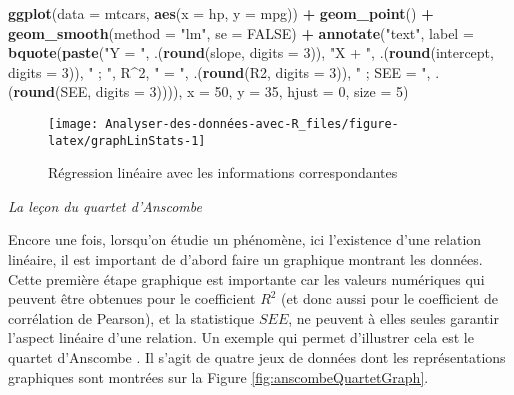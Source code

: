 \documentclass[
  french,
]{book}
\newenvironment{Shaded}{\begin{snugshade}}{\end{snugshade}}
\newcommand{\DataTypeTok}[1]{\textcolor[rgb]{0.13,0.29,0.53}{#1}}
\newcommand{\DecValTok}[1]{\textcolor[rgb]{0.00,0.00,0.81}{#1}}
\newcommand{\KeywordTok}[1]{\textcolor[rgb]{0.13,0.29,0.53}{\textbf{#1}}}
\newcommand{\NormalTok}[1]{#1}
\newcommand{\OperatorTok}[1]{\textcolor[rgb]{0.81,0.36,0.00}{\textbf{#1}}}
\newcommand{\OtherTok}[1]{\textcolor[rgb]{0.56,0.35,0.01}{#1}}
\newcommand{\StringTok}[1]{\textcolor[rgb]{0.31,0.60,0.02}{#1}}
\begin{document}
\begin{Shaded}
\begin{Highlighting}[]
\KeywordTok{ggplot}\NormalTok{(}\DataTypeTok{data =}\NormalTok{ mtcars, }\KeywordTok{aes}\NormalTok{(}\DataTypeTok{x =}\NormalTok{ hp, }\DataTypeTok{y =}\NormalTok{ mpg)) }\OperatorTok{+}
\StringTok{  }\KeywordTok{geom_point}\NormalTok{() }\OperatorTok{+}
\StringTok{  }\KeywordTok{geom_smooth}\NormalTok{(}\DataTypeTok{method =} \StringTok{"lm"}\NormalTok{, }\DataTypeTok{se =} \OtherTok{FALSE}\NormalTok{) }\OperatorTok{+}
\StringTok{  }\KeywordTok{annotate}\NormalTok{(}\StringTok{"text"}\NormalTok{, }\DataTypeTok{label =} \KeywordTok{bquote}\NormalTok{(}\KeywordTok{paste}\NormalTok{(}\StringTok{"Y = "}\NormalTok{, .(}\KeywordTok{round}\NormalTok{(slope, }\DataTypeTok{digits =} \DecValTok{3}\NormalTok{)), }\StringTok{"X + "}\NormalTok{, }
\NormalTok{                                        .(}\KeywordTok{round}\NormalTok{(intercept, }\DataTypeTok{digits =} \DecValTok{3}\NormalTok{)), }\StringTok{" ; "}\NormalTok{,}
\NormalTok{                                        R}\OperatorTok{^}\DecValTok{2}\NormalTok{, }\StringTok{" = "}\NormalTok{, .(}\KeywordTok{round}\NormalTok{(R2, }\DataTypeTok{digits =} \DecValTok{3}\NormalTok{)), }
                                        \StringTok{" ; SEE = "}\NormalTok{, .(}\KeywordTok{round}\NormalTok{(SEE, }\DataTypeTok{digits =} \DecValTok{3}\NormalTok{)))), }
           \DataTypeTok{x =} \DecValTok{50}\NormalTok{, }\DataTypeTok{y =} \DecValTok{35}\NormalTok{, }\DataTypeTok{hjust =} \DecValTok{0}\NormalTok{, }\DataTypeTok{size =} \DecValTok{5}\NormalTok{)}
\end{Highlighting}
\end{Shaded}

\begin{figure}

{\centering \texttt{[image: Analyser-des-données-avec-R\_files/figure-latex/graphLinStats-1]} 

}

\caption{Régression linéaire avec les informations correspondantes}\label{fig:graphLinStats}
\end{figure}

\emph{La leçon du quartet d'Anscombe}

Encore une fois, lorsqu'on étudie un phénomène, ici l'existence d'une relation linéaire, il est important de d'abord faire un graphique montrant les données. Cette première étape graphique est importante car les valeurs numériques qui peuvent être obtenues pour le coefficient \(R^2\) (et donc aussi pour le coefficient de corrélation de Pearson), et la statistique \(SEE\), ne peuvent à elles seules garantir l'aspect linéaire d'une relation. Un exemple qui permet d'illustrer cela est le quartet d'Anscombe \autocite*{anscombeGraphsStatisticalAnalysis1973}. Il s'agit de quatre jeux de données dont les représentations graphiques sont montrées sur la Figure \ref{fig:anscombeQuartetGraph}.
\end{document}
